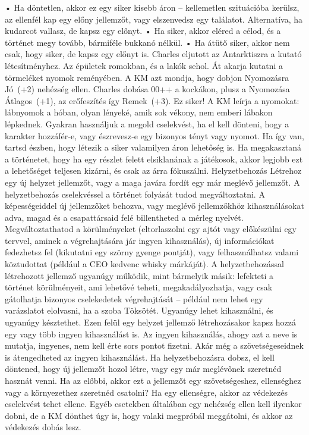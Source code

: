 \documentclass[oneside]{book}
\begin{document}
    • Ha döntetlen, akkor ez egy siker kisebb áron – kellemetlen szituációba kerülsz, az ellenfél kap egy előny jellemzőt, vagy elszenvedsz egy találatot. Alternatíva, ha kudarcot vallasz, de kapsz egy előnyt.
    • Ha siker, akkor eléred a célod, és a történet megy tovább, bármiféle bukkanó nélkül.
    • Ha átütő siker, akkor nem csak, hogy siker, de kapsz egy előnyt is.
Charles eljutott az Antarktiszra a kutató létesítményhez. Az épületek romokban, és a lakók sehol. Át akarja kutatni a törmeléket nyomok reményében. A KM azt mondja, hogy dobjon Nyomozásra Jó~(+2) nehézség ellen. Charles dobása 00++ a kockákon, plusz a Nyomozása Átlagos~(+1), az erőfeszítés így Remek~(+3). Ez siker! A KM leírja a nyomokat: lábnyomok a hóban, olyan lényeké, amik sok vékony, nem emberi lábakon lépkednek.
Gyakran használjuk a megold cselekvést, ha el kell dönteni, hogy a karakter hozzáfér‑e, vagy észrevesz‑e egy bizonyos tényt vagy nyomot. Ha így van, tartsd észben, hogy létezik a siker valamilyen áron lehetőség is. Ha megakasztaná a történetet, hogy ha egy részlet felett elsiklanának a játékosok, akkor legjobb ezt a lehetőséget teljesen kizárni, és csak az árra fókuszálni.
Helyzetbehozás
Létrehoz egy új helyzet jellemzőt, vagy a maga javára fordít egy már meglévő jellemzőt.
A helyzetbehozás cselekvéssel a történet folyását tudod megváltoztatni. A képességeiddel új jellemzőket behozva, vagy meglévő jellemzőkhöz kihasználásokat adva, magad és a csapattársaid felé billentheted a mérleg nyelvét. Megváltoztathatod a körülményeket (eltorlaszolni egy ajtót vagy előkészülni egy tervvel, aminek a végrehajtására jár ingyen kihasználás), új információkat fedezhetsz fel (kikutatni egy szörny gyenge pontját), vagy felhasználhatsz valami köztudottat (például a CEO kedvenc whisky márkáját).
A helyzetbehozással létrehozott jellemző ugyanúgy működik, mint bármelyik másik: lefekteti a történet körülményeit, ami lehetővé teheti, megakadályozhatja, vagy csak gátolhatja bizonyos cselekedetek végrehajtását – például nem lehet egy varázslatot elolvasni, ha a szoba Töksötét. Ugyanúgy lehet kihasználni, és ugyanúgy késztethet. Ezen felül egy helyzet jellemző létrehozásakor kapsz hozzá egy vagy több ingyen kihasználást is. Az ingyen kihasználás, ahogy azt a neve is mutatja, ingyenes, nem kell érte sors pontot fizetni. Akár még a szövetségeseidnek is átengedheted az ingyen kihasználást.
Ha helyzetbehozásra dobsz, el kell döntened, hogy új jellemzőt hozol létre, vagy egy már meglévőnek szeretnéd hasznát venni. Ha az előbbi, akkor ezt a jellemzőt egy szövetségeshez, ellenséghez vagy a környezethez szeretnéd csatolni? Ha egy ellenségre, akkor az védekezés cselekvést tehet ellene. Egyéb esetekben általában egy nehézség ellen kell ilyenkor dobni, de a KM dönthet úgy is, hogy valaki megpróbál meggátolni, és akkor az védekezés dobás lesz.
\end{document}
